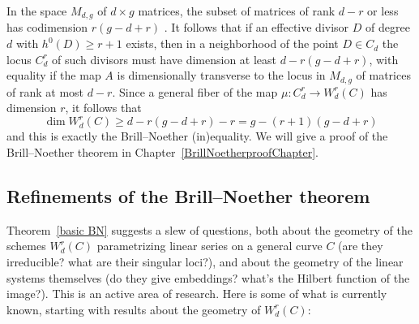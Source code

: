 In the space $M_{d,g}$ of $d \times g$ matrices, the subset of matrices
of rank $d-r$ or less has codimension $r(g-d+r)$
\cite[Exercise 10.9]{Eisenbud1995}.
It follows
that if  an effective divisor $D$ of degree $d$ with $h^0(D) \geq r+1$
exists, then in a neighborhood of the point $D \in C_d$ the locus
$C^r_d$ of such divisors must have dimension at least $d - r(g-d+r)$,
with equality if the map $A$ is dimensionally transverse to the locus
in $M_{d,g}$ of matrices of rank at most $d-r$. Since a general fiber
%
%
of the map $\mu :
C^r_d
 \to
W^r_d
(C)$ has dimension $r$, it follows that
$$
\dim W^r_d(C) \geq d - r(g-d+r) - r = g - (r+1)(g-d+r)
$$
and this is exactly the  Brill--Noether (in)equality. We will give a proof
of the Brill--Noether theorem in Chapter~\ref{BrillNoetherproofChapter}.


\subsection{Refinements of the Brill--Noether theorem}

Theorem~\ref{basic BN} suggests a slew of questions, both about the
geometry of the schemes $W^r_d(C)$ parametrizing linear series on a
general curve $C$ (are they irreducible? what are their singular
loci?), and about the geometry of the linear systems themselves (do
they give embeddings? what's the Hilbert function of the image?). This
is an active area of research. Here is some of what is currently
known, starting with results about the geometry of $W^r_d(C)$:

